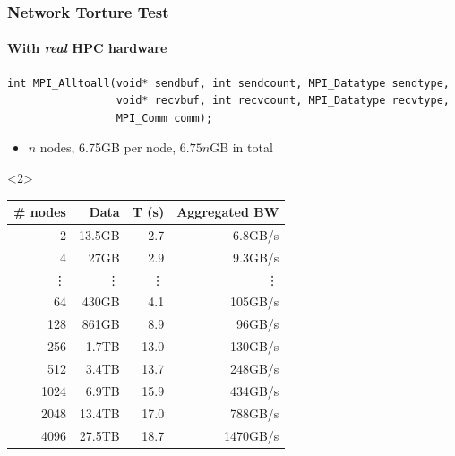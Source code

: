 \documentclass[xcolor={x11names,svgnames,psnames}]{beamer}
\newenvironment{wider}{%
\begin{adjustwidth}{-0.6cm}{}%
  \begin{minipage}{12cm}%
}{%
\end{minipage}%
\end{adjustwidth}%
}
\begin{document}
\begin{frame}[fragile]
  \frametitle{Network Torture Test}
  \framesubtitle{With \emph{real} HPC hardware}

  \begin{wider}
\begin{verbatim}
int MPI_Alltoall(void* sendbuf, int sendcount, MPI_Datatype sendtype,
                 void* recvbuf, int recvcount, MPI_Datatype recvtype,
                 MPI_Comm comm);
\end{verbatim}
  \end{wider}

    \begin{itemize}  
    \item $n$ nodes, 6.75GB per node, $6.75n$GB in total
    \end{itemize}
 
\medskip

\footnotesize
\begin{overlayarea}{\textwidth}{5cm}
  \centering
  
  \begin{onlyenv}<2>
    \begin{tabular}{|r|r|r|r|}
  \hline
  \# nodes & Data             & T (s)        & Aggregated BW \\
  \hline\hline
  2        & 13.5GB           & 2.7      & 6.8GB/s \\
  4        & 27GB             & 2.9      & 9.3GB/s \\
    \vdots & \vdots           & \vdots   & \vdots  \\                                         
  64       & 430GB            & 4.1      & 105GB/s \\
  128      & 861GB            & 8.9      &  96GB/s \\
  256      & 1.7TB            & 13.0     & 130GB/s \\
  512      & 3.4TB            & 13.7     & 248GB/s \\
  1024     & 6.9TB            & 15.9     & 434GB/s \\
  2048     & 13.4TB           & 17.0     & 788GB/s \\
  4096     & 27.5TB           & 18.7     & 1470GB/s \\
    \hline
    \end{tabular}
  \end{onlyenv}
\end{overlayarea}

\end{frame}
\end{document}
